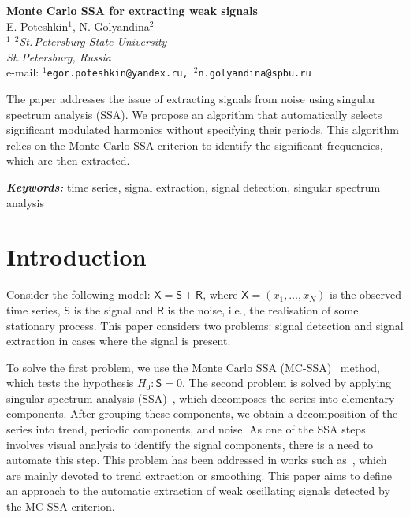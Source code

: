 \documentclass[12pt]{article}
\providecommand{\keywords}[1]
{
\vspace{2mm}\hspace{20pt}\textbf{\textit{Keywords:}} #1
}
\providecommand{\abskeyw}[2]
{
\begin{small}
\begin{adjustwidth}{10mm}{10mm}
\vspace{1mm}\hspace{20pt}#1

\keywords{#2}
\end{adjustwidth}
\end{small}
}
\begin{document}
\begin{center}
{\Large\bf Monte Carlo SSA for extracting weak signals}\\\vspace{2mm} {\sc E. Poteshkin$^1$, N. Golyandina$^2$}\\\vspace{2mm}
{\it $^{1}$ $^{2}$St.\,Petersburg State University\\
St.\,Petersburg, Russia\\} e-mail: {\tt $^1$egor.poteshkin@yandex.ru,
$^2$n.golyandina@spbu.ru}

\abskeyw{The paper addresses the issue of extracting signals from noise using singular spectrum analysis (SSA). We propose an algorithm that automatically selects significant modulated harmonics without specifying their periods. This algorithm relies on the Monte Carlo SSA criterion to identify the significant frequencies, which are then extracted.}{time series, signal extraction, signal detection, singular spectrum analysis}
\end{center}

\section{Introduction}

Consider the following model: $\mathsf{X}=\mathsf{S}+\mathsf{R}$, where $\mathsf{X} = (x_1,\ldots,x_N)$ is the observed time series, $\mathsf{S}$ is the signal and $\mathsf{R}$ is the noise, i.e., the realisation of some stationary process. This paper considers two problems: signal detection and signal extraction in cases where the signal is present.

To solve the first problem, we use the Monte Carlo SSA (MC-SSA)~\cite{AllenSmith96} method, which tests the hypothesis $H_0:\mathsf{S}=0$. The second problem is solved by applying singular spectrum analysis (SSA)~\cite{Broomhead1986, ssa2001}, which decomposes the series into elementary components. After grouping these components, we obtain a decomposition of the series into trend, periodic components, and noise. As one of the SSA steps involves visual analysis to identify the signal components, there is a need to automate this step. This problem has been addressed in works such as~\cite{alexandrov, Kalantari2019, circSSA, autoSSA}, which are mainly devoted to trend extraction or smoothing. This paper aims to define an approach to the automatic extraction of weak oscillating signals detected by the MC-SSA criterion.
\end{document}
